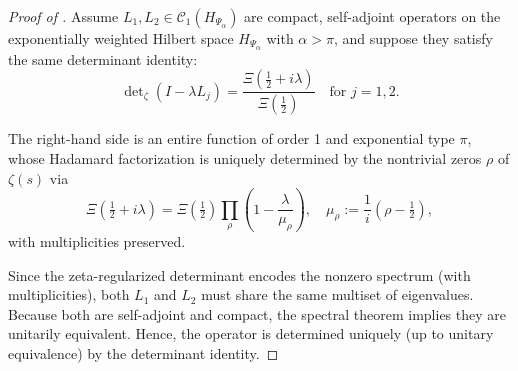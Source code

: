 \begin{proof}[Proof of ]
Assume $L_1, L_2 \in \mathcal{C}_1(H_{\Psi_\alpha})$ are compact, self-adjoint operators on the exponentially weighted Hilbert space $H_{\Psi_\alpha}$ with $\alpha > \pi$, and suppose they satisfy the same determinant identity:
\[
\det\nolimits_{\zeta}(I - \lambda L_j) = \frac{\Xi\left(\tfrac{1}{2} + i\lambda\right)}{\Xi\left(\tfrac{1}{2}\right)} \quad \text{for } j = 1,2.
\]

The right-hand side is an entire function of order 1 and exponential type $\pi$, whose Hadamard factorization is uniquely determined by the nontrivial zeros $\rho$ of $\zeta(s)$ via
\[
\Xi\left(\tfrac{1}{2} + i\lambda\right) = \Xi\left(\tfrac{1}{2}\right) \prod_{\rho} \left(1 - \frac{\lambda}{\mu_\rho}\right),
\quad \mu_\rho := \frac{1}{i}(\rho - \tfrac{1}{2}),
\]
with multiplicities preserved.

Since the zeta-regularized determinant encodes the nonzero spectrum (with multiplicities), both $L_1$ and $L_2$ must share the same multiset of eigenvalues. Because both are self-adjoint and compact, the spectral theorem implies they are unitarily equivalent. Hence, the operator is determined uniquely (up to unitary equivalence) by the determinant identity.
\end{proof}
